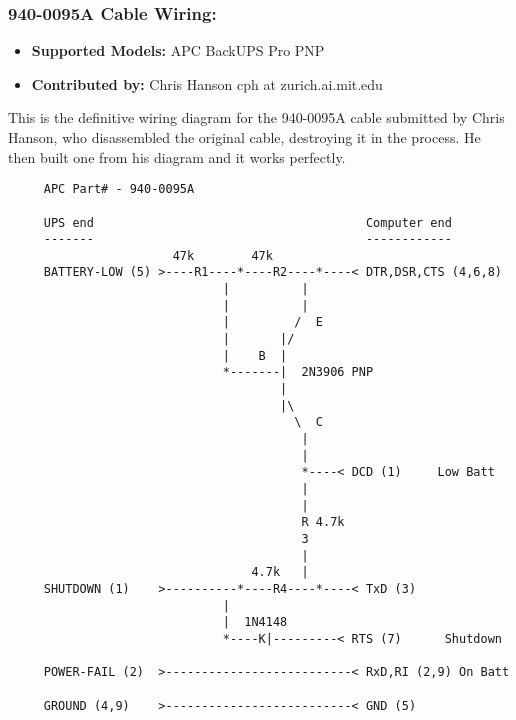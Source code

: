 \subsubsection*{940-0095A Cable Wiring:}

\begin{itemize}
\item {\bf Supported Models:} APC BackUPS Pro PNP
\item {\bf Contributed by:} Chris Hanson \lt{}cph at zurich.ai.mit.edu\gt{}
\end{itemize}

This is the definitive wiring diagram for the 940-0095A cable submitted by
Chris Hanson, who disassembled the original cable, destroying it in the process.
He then built one from his diagram and it works perfectly. 

\footnotesize
\begin{verbatim}
     APC Part# - 940-0095A

     UPS end                                      Computer end
     -------                                      ------------
                       47k        47k
     BATTERY-LOW (5) >----R1----*----R2----*----< DTR,DSR,CTS (4,6,8)
                              |          |
                              |          |
                              |         /  E
                              |       |/
                              |    B  |
                              *-------|  2N3906 PNP
                                      |
                                      |\
                                        \  C
                                         |
                                         |
                                         *----< DCD (1)     Low Batt
                                         |
                                         |
                                         R 4.7k
                                         3
                                         |
                                  4.7k   |
     SHUTDOWN (1)    >----------*----R4----*----< TxD (3)
                              |
                              |  1N4148
                              *----K|---------< RTS (7)      Shutdown
     
     POWER-FAIL (2)  >--------------------------< RxD,RI (2,9) On Batt
     
     GROUND (4,9)    >--------------------------< GND (5)
\end{verbatim}
\normalsize

